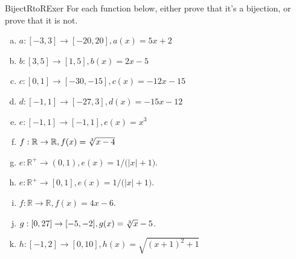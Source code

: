 \begin{exercise}{BijectRtoRExer}
For each function below, either prove that it's a bijection, or prove that it is not.
\begin{enumerate}[(a)]
\item \label{BijectRtoRExer-(5x+2)}
$a:[-3,3] \rightarrow [-20,20], a(x) = 5x+2$
\item \label{BijectRtoRExer-(2x-5)}
$b:[3,5] \rightarrow [1,5],b(x) = 2x - 5$
\item \label{BijectRtoRExer-(12x-15)}
 $c:[0,1] \rightarrow [-30,-15], c(x) = -12x-15$
\item \label{BijectRtoRExer-(-15x-12)}
$d:[-1,1] \rightarrow [-27,3], d(x) = -15x - 12$
\item \label{BijectRtoRExer-(x^3)}
$e:[-1,1] \rightarrow [-1,1], e(x) = x^3$
\item \label{BijectRtoRExer-(root3of(x-4))}
$f: \mathbb{R} \rightarrow \mathbb{R}, f(x) = \root 3 \of {x-4} $
\item \label{WhichBijRExer-(1/(|x|+1))}
$e:\mathbb{R}^+ \rightarrow (0,1), e(x) = 1/ \bigl( |x| + 1 \bigr)$.
\item \label{WhichBijRExer-(1/(|x|+1))2}
$e:\mathbb{R}^+ \rightarrow [0,1], e(x) = 1/ \bigl( |x| + 1 \bigr)$.
\item \label{WhichBijRExer-(4x-6)}
$f: \mathbb{R} \rightarrow \mathbb{R}, f(x) = 4x - 6$.
\item \label{WhichBijRExer-(root3ofx-5)}
$g: [0,27] \rightarrow [-5,-2], g(x) = \root 3 \of {x} - 5$.
\item \label{WhichBijRExer-(sqrt(x^2+1))}
$h:[-1,2] \rightarrow [0,10], h(x) = \sqrt{(x+1)^2 + 1}$
\end{enumerate}
\end{exercise}
%
%

